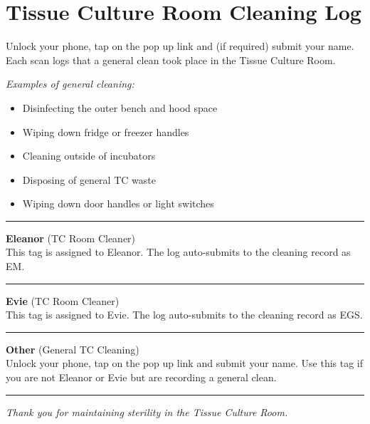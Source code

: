 \documentclass[a4paper,12pt]{article}
\begin{document}
	
	\section*{Tissue Culture Room Cleaning Log}

	
	\noindent
	Unlock your phone, tap on the pop up link and (if required) submit your name.  
	Each scan logs that a general clean took place in the Tissue Culture Room. 
	
	\vspace{0.5cm}
	\textit{Examples of general cleaning:}
	\begin{itemize}
		\setlength\itemsep{0.5em}
		\item Disinfecting the outer bench and hood space
		\item Wiping down fridge or freezer handles
		\item Cleaning outside of incubators
		\item Disposing of general TC waste
		\item Wiping down door handles or light switches
	\end{itemize}
	
	\vspace{1cm}
	\hrule
	\vspace{0.5cm}
	
	\textbf{Eleanor} (TC Room Cleaner)\\
	This tag is assigned to Eleanor. The log auto-submits to the cleaning record as EM.
	
	\vspace{4cm}
	\hrule
	\vspace{0.5cm}
	
	\textbf{Evie} (TC Room Cleaner)\\
	This tag is assigned to Evie. The log auto-submits to the cleaning record as EGS.
	
	\vspace{4cm}
	\hrule
	\vspace{0.5cm}
	
	\textbf{Other} (General TC Cleaning)\\
	Unlock your phone, tap on the pop up link and submit your name.  
	Use this tag if you are not Eleanor or Evie but are recording a general clean.
	
	\vspace{3.5cm}
	\hrule
	\vspace{0.5cm}
	
	\begin{center}
		\textit{Thank you for maintaining sterility in the Tissue Culture Room.}
	\end{center}
	
\end{document}
